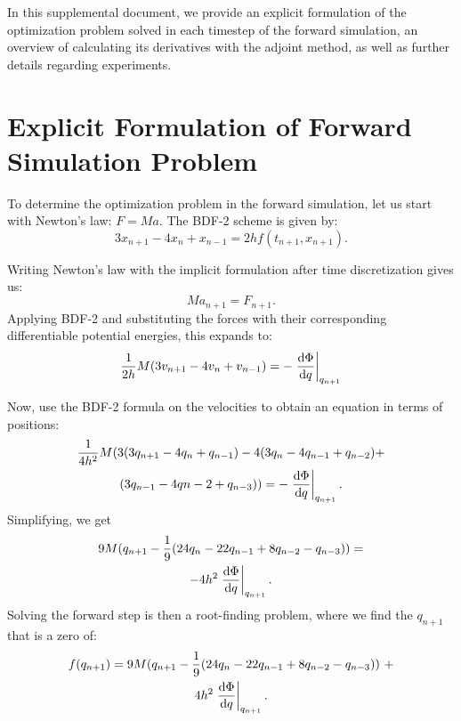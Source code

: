 \clearpage
\setcounter{page}{1}
\maketitlesupplementary
\appendix

In this supplemental document, we provide an explicit formulation of the optimization problem solved in each timestep of the forward simulation, an overview of calculating its derivatives with the adjoint method, as well as further details regarding experiments.

\section{Explicit Formulation of Forward Simulation Problem}\label{app:forward-sim}
To determine the optimization problem in the forward simulation, let us start with Newton's law: $F = Ma$. 
The BDF-2 scheme is given by: 
\begin{equation}
3x_{n+1} - 4x_n + x_{n-1} = 2h f(t_{n+1}, x_{n+1}).
\end{equation}

Writing Newton's law with the implicit formulation after time discretization gives us:
$$ M a_{n+1} = F_{n+1}.$$ 
Applying BDF-2 and substituting the forces with their corresponding differentiable potential energies, this expands to:
\begin{equation*}
\frac{1}{2h}M (3v_{n+1} - 4v_{n} + v_{n-1}) = -\left.\dv{\Phi}{q} \right\vert_{q_{n+1}}%
\end{equation*}

Now, use the BDF-2 formula on the velocities to obtain an equation in terms of positions:
\begin{multline*}
\frac{1}{4h^2} M (3(3q_{n+1} - 4q_n + q_{n-1}) - 4(3q_n - 4q_{n-1} + q_{n-2}) + \\ (3q_{n-1} - 4q{n-2} + q_{n-3})) = -\left.\dv{\Phi}{q} \right\vert_{q_{n+1}}.
\end{multline*}
Simplifying, we get
\begin{multline*}
9 M (q_{n+1} - \frac{1}{9}(24q_n - 22q_{n-1} + 8q_{n-2} - q_{n-3})) =\\ -4h^2 \left.\dv{\Phi}{q} \right\vert_{q_{n+1}}.
\end{multline*}
Solving the forward step is then a root-finding problem, where we find the $q_{n+1}$ that is a zero of:
\begin{multline*}
f(q_{n+1}) = 9 M (q_{n+1} - \frac{1}{9}(24q_n - 22q_{n-1} + 8q_{n-2} - q_{n-3}))\ + \\4h^2 \left.\dv{\Phi}{q} \right\vert_{q_{n+1}}.
\end{multline*}

